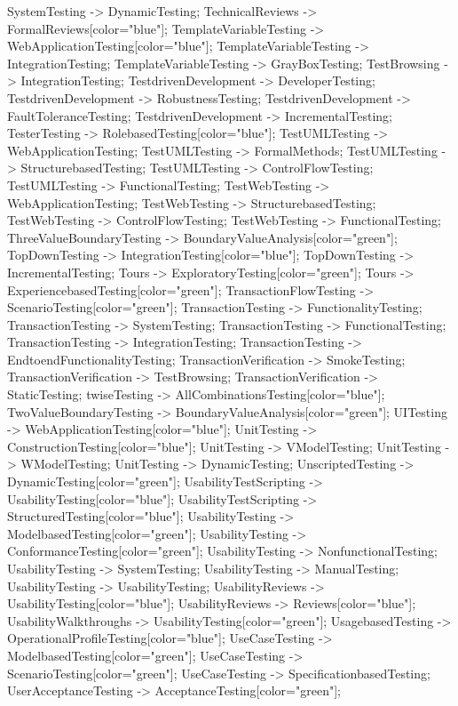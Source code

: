 \documentclass{article}
\begin{document}
{SystemTesting -> DynamicTesting;
TechnicalReviews -> FormalReviews[color="blue"];
TemplateVariableTesting -> WebApplicationTesting[color="blue"];
TemplateVariableTesting -> IntegrationTesting;
TemplateVariableTesting -> GrayBoxTesting;
TestBrowsing -> IntegrationTesting;
TestdrivenDevelopment -> DeveloperTesting;
TestdrivenDevelopment -> RobustnessTesting;
TestdrivenDevelopment -> FaultToleranceTesting;
TestdrivenDevelopment -> IncrementalTesting;
TesterTesting -> RolebasedTesting[color="blue"];
TestUMLTesting -> WebApplicationTesting;
TestUMLTesting -> FormalMethods;
TestUMLTesting -> StructurebasedTesting;
TestUMLTesting -> ControlFlowTesting;
TestUMLTesting -> FunctionalTesting;
TestWebTesting -> WebApplicationTesting;
TestWebTesting -> StructurebasedTesting;
TestWebTesting -> ControlFlowTesting;
TestWebTesting -> FunctionalTesting;
ThreeValueBoundaryTesting -> BoundaryValueAnalysis[color="green"];
TopDownTesting -> IntegrationTesting[color="blue"];
TopDownTesting -> IncrementalTesting;
Tours -> ExploratoryTesting[color="green"];
Tours -> ExperiencebasedTesting[color="green"];
TransactionFlowTesting -> ScenarioTesting[color="green"];
TransactionTesting -> FunctionalityTesting;
TransactionTesting -> SystemTesting;
TransactionTesting -> FunctionalTesting;
TransactionTesting -> IntegrationTesting;
TransactionTesting -> EndtoendFunctionalityTesting;
TransactionVerification -> SmokeTesting;
TransactionVerification -> TestBrowsing;
TransactionVerification -> StaticTesting;
twiseTesting -> AllCombinationsTesting[color="blue"];
TwoValueBoundaryTesting -> BoundaryValueAnalysis[color="green"];
UITesting -> WebApplicationTesting[color="blue"];
UnitTesting -> ConstructionTesting[color="blue"];
UnitTesting -> VModelTesting;
UnitTesting -> WModelTesting;
UnitTesting -> DynamicTesting;
UnscriptedTesting -> DynamicTesting[color="green"];
UsabilityTestScripting -> UsabilityTesting[color="blue"];
UsabilityTestScripting -> StructuredTesting[color="blue"];
UsabilityTesting -> ModelbasedTesting[color="green"];
UsabilityTesting -> ConformanceTesting[color="green"];
UsabilityTesting -> NonfunctionalTesting;
UsabilityTesting -> SystemTesting;
UsabilityTesting -> ManualTesting;
UsabilityTesting -> UsabilityTesting;
UsabilityReviews -> UsabilityTesting[color="blue"];
UsabilityReviews -> Reviews[color="blue"];
UsabilityWalkthroughs -> UsabilityTesting[color="green"];
UsagebasedTesting -> OperationalProfileTesting[color="blue"];
UseCaseTesting -> ModelbasedTesting[color="green"];
UseCaseTesting -> ScenarioTesting[color="green"];
UseCaseTesting -> SpecificationbasedTesting;
UserAcceptanceTesting -> AcceptanceTesting[color="green"];
}
\end{document}
